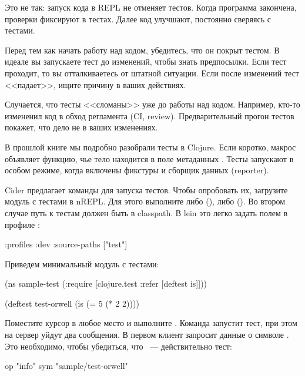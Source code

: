 Это не так: запуск кода в REPL не отменяет тестов. Когда программа закончена, проверки фиксируют в тестах. Далее код улучшают, постоянно сверяясь с тестами.

Перед тем как начать работу над кодом, убедитесь, что он покрыт тестом. В идеале вы запускаете тест до изменений, чтобы знать предпосылки. Если тест проходит, то вы отталкиваетесь от штатной ситуации. Если после изменений тест <<падает>>, ищите причину в ваших действиях.

Случается, что тесты <<сломаны>> уже до работы над кодом. Например, кто-то измененил код в обход регламента (CI, review). Предварительный прогон тестов покажет, что дело не в ваших изменениях.

В прошлой книге мы подробно разобрали тесты в Clojure. Если коротко, макрос  объявляет функцию, чье тело находится в поле метаданных . Тесты запускают в особом режиме, когда включены фикстуры и сборщик данных (reporter).

Cider предлагает команды для запуска тестов. Чтобы опробовать их, загрузите модуль с тестами в nREPL. Для этого выполните либо  (), либо  (). Во втором случае путь к тестам должен быть в classpath. В lein это легко задать полем  в профиле :

\begin{english}
  \begin{clojure}
{:profiles
 {:dev
  {:source-paths ["test"]}}}
  \end{clojure}
\end{english}

Приведем минимальный модуль с тестами:

\begin{english}
  \begin{clojure}
(ns sample-test
  (:require
   [clojure.test :refer
     [deftest is]]))

(deftest test-orwell
  (is (= 5 (* 2 2))))
  \end{clojure}
\end{english}

Поместите курсор в любое место  и выполните . Команда запустит тест, при этом на сервер уйдут два сообщения. В первом клиент запросит данные о символе . Это необходимо, чтобы убедиться, что ~--- действительно тест:

\begin{english}
  \begin{text}
  op   "info"
  sym  "sample/test-orwell"
  \end{text}
\end{english}

